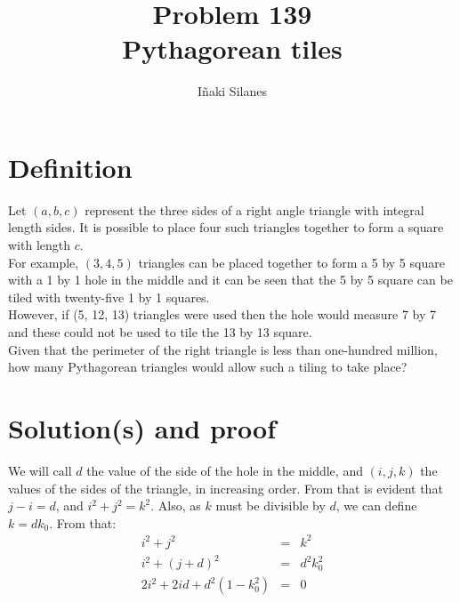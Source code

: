 \documentclass[english]{article}
\begin{document}
\newcommand{\mc}{\multicolumn}
\newcommand{\mr}{\multirow}
\newcommand{\cw}{\columnwidth}
\newcommand{\ig}[2]{\texttt{[image: \#2]}}

\title{Problem 139\\Pythagorean tiles}
\author{I\~naki Silanes}
\maketitle

\section{Definition}

Let $(a, b, c)$ represent the three sides of a right angle triangle with integral length sides. It is possible to place four such triangles together to form a square with length $c$.\\

For example, $(3, 4, 5)$ triangles can be placed together to form a 5 by 5 square with a 1 by 1 hole in the middle and it can be seen that the 5 by 5 square can be tiled with twenty-five 1 by 1 squares.\\

However, if (5, 12, 13) triangles were used then the hole would measure 7 by 7 and these could not be used to tile the 13 by 13 square.\\

Given that the perimeter of the right triangle is less than one-hundred million, how many Pythagorean triangles would allow such a tiling to take place?

\section{Solution(s) and proof}

We will call $d$ the value of the side of the hole in the middle, and $(i, j, k)$ the values of the sides of the triangle, in increasing order. From that is evident that $j - i = d$, and $i^2 + j^2 = k^2$. Also, as $k$ must be divisible by $d$, we can define $k = d k_0$. From that:\\

\begin{eqnarray}
i^2 + j^2 & = & k^2 \\
i^2 + (j+d)^2 & = & d^2 k_0^2 \\
2 i^2 + 2id + d^2(1-k_0^2) & = & 0 
\end{eqnarray}
\end{document}
